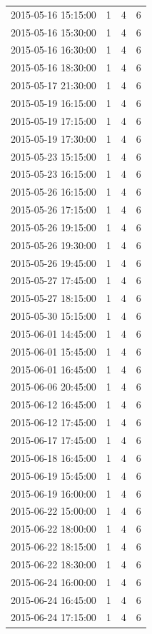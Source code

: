 \begin{tabular}{lrrr}
2015-05-16 15:15:00 & 1 & 4 & 6 \\
2015-05-16 15:30:00 & 1 & 4 & 6 \\
2015-05-16 16:30:00 & 1 & 4 & 6 \\
2015-05-16 18:30:00 & 1 & 4 & 6 \\
2015-05-17 21:30:00 & 1 & 4 & 6 \\
2015-05-19 16:15:00 & 1 & 4 & 6 \\
2015-05-19 17:15:00 & 1 & 4 & 6 \\
2015-05-19 17:30:00 & 1 & 4 & 6 \\
2015-05-23 15:15:00 & 1 & 4 & 6 \\
2015-05-23 16:15:00 & 1 & 4 & 6 \\
2015-05-26 16:15:00 & 1 & 4 & 6 \\
2015-05-26 17:15:00 & 1 & 4 & 6 \\
2015-05-26 19:15:00 & 1 & 4 & 6 \\
2015-05-26 19:30:00 & 1 & 4 & 6 \\
2015-05-26 19:45:00 & 1 & 4 & 6 \\
2015-05-27 17:45:00 & 1 & 4 & 6 \\
2015-05-27 18:15:00 & 1 & 4 & 6 \\
2015-05-30 15:15:00 & 1 & 4 & 6 \\
2015-06-01 14:45:00 & 1 & 4 & 6 \\
2015-06-01 15:45:00 & 1 & 4 & 6 \\
2015-06-01 16:45:00 & 1 & 4 & 6 \\
2015-06-06 20:45:00 & 1 & 4 & 6 \\
2015-06-12 16:45:00 & 1 & 4 & 6 \\
2015-06-12 17:45:00 & 1 & 4 & 6 \\
2015-06-17 17:45:00 & 1 & 4 & 6 \\
2015-06-18 16:45:00 & 1 & 4 & 6 \\
2015-06-19 15:45:00 & 1 & 4 & 6 \\
2015-06-19 16:00:00 & 1 & 4 & 6 \\
2015-06-22 15:00:00 & 1 & 4 & 6 \\
2015-06-22 18:00:00 & 1 & 4 & 6 \\
2015-06-22 18:15:00 & 1 & 4 & 6 \\
2015-06-22 18:30:00 & 1 & 4 & 6 \\
2015-06-24 16:00:00 & 1 & 4 & 6 \\
2015-06-24 16:45:00 & 1 & 4 & 6 \\
2015-06-24 17:15:00 & 1 & 4 & 6 \\

\end{tabular}

